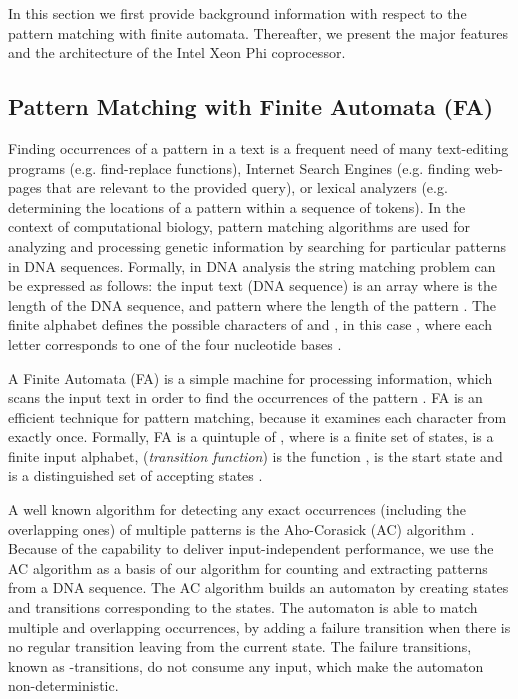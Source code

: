 \documentclass[conference]{IEEEtran}
\begin{document}
In this section we first provide background information with respect to the pattern matching with finite automata. Thereafter, we present the major features and the architecture of the Intel Xeon Phi coprocessor.

\subsection{Pattern Matching with Finite Automata (FA)}

Finding occurrences of a pattern in a text is a frequent need of many text-editing programs (e.g. find-replace functions), Internet Search Engines (e.g. finding web-pages that are relevant to the provided query), or lexical analyzers (e.g. determining the locations of a pattern within a sequence of tokens). In the context of computational biology, pattern matching algorithms are used for analyzing and processing genetic information by searching for particular patterns in DNA sequences. Formally, in DNA analysis the string matching problem can be expressed as follows: the input text (DNA sequence) is an array  where  is the length of the DNA sequence, and pattern  where the length of the pattern . The finite alphabet  defines the possible characters of  and , in this case , where each letter corresponds to one of the four nucleotide bases \cite{hopcroftullman}.

A Finite Automata (FA) is a simple machine for processing information, which scans the input text  in order to find the occurrences of the pattern . FA is an efficient technique for pattern matching, because it examines each character from  exactly once. Formally, FA is a quintuple of , where  is a finite set of states,  is a finite input alphabet,  (\emph{transition function}) is the function ,  is the start state and  is a distinguished set of accepting states \cite{hopcroftullman}.

A well known algorithm for detecting any exact occurrences (including the overlapping ones) of multiple patterns is the Aho-Corasick (AC) algorithm \cite{Aho-Corasick}. Because of the capability to deliver input-independent performance, we use the AC algorithm as a basis of our algorithm for counting and extracting patterns from a DNA sequence. The AC algorithm builds an automaton by creating states and transitions corresponding to the states. The automaton is able to match multiple and overlapping occurrences, by adding a failure transition when there is no regular transition leaving from the current state. The failure transitions, known as -transitions, do not consume any input, which make the automaton non-deterministic.
\end{document}
